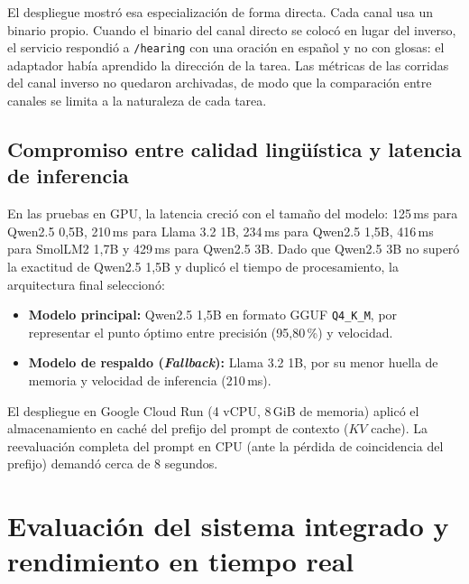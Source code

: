 El despliegue mostró esa especialización de forma directa. Cada canal usa un binario propio. Cuando el binario del canal directo se colocó en lugar del inverso, el servicio respondió a \texttt{/hearing} con una oración en español y no con glosas: el adaptador había aprendido la dirección de la tarea. Las métricas de las corridas del canal inverso no quedaron archivadas, de modo que la comparación entre canales se limita a la naturaleza de cada tarea.

\subsection{Compromiso entre calidad lingüística y latencia de inferencia}
En las pruebas en GPU, la latencia creció con el tamaño del modelo: 125\,ms para Qwen2.5 0,5B, 210\,ms para Llama 3.2 1B, 234\,ms para Qwen2.5 1,5B, 416\,ms para SmolLM2 1,7B y 429\,ms para Qwen2.5 3B. Dado que Qwen2.5 3B no superó la exactitud de Qwen2.5 1,5B y duplicó el tiempo de procesamiento, la arquitectura final seleccionó:
\begin{itemize}
    \item \textbf{Modelo principal:} Qwen2.5 1,5B en formato GGUF \texttt{Q4\_K\_M}, por representar el punto óptimo entre precisión (95{,}80\,\%) y velocidad.
    \item \textbf{Modelo de respaldo (\textit{Fallback}):} Llama 3.2 1B, por su menor huella de memoria y velocidad de inferencia (210\,ms).
\end{itemize}

El despliegue en Google Cloud Run (4 vCPU, 8\,GiB de memoria) aplicó el almacenamiento en caché del prefijo del prompt de contexto ($KV$ cache). La reevaluación completa del prompt en CPU (ante la pérdida de coincidencia del prefijo) demandó cerca de 8 segundos.

\section{Evaluación del sistema integrado y rendimiento en tiempo real}


